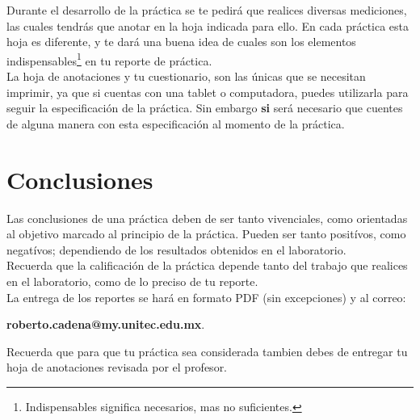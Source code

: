     Durante el desarrollo de la práctica se te pedirá que realices diversas mediciones, las cuales tendrás que anotar en la hoja indicada para ello. En cada práctica esta hoja es diferente, y te dará una buena idea de cuales son los elementos indispensables\footnote{Indispensables significa necesarios, mas no suficientes.} en tu reporte de práctica. \\

    La hoja de anotaciones y tu cuestionario, son las únicas que se necesitan imprimir, ya que si cuentas con una tablet o computadora, puedes utilizarla para seguir la especificación de la práctica. Sin embargo \textbf{si} será necesario que cuentes de alguna manera con esta especificación al momento de la práctica.


\section{Conclusiones}
	Las conclusiones de una práctica deben de ser tanto vivenciales, como orientadas al objetivo marcado al principio de la práctica. Pueden ser tanto positívos, como negatívos; dependiendo de los resultados obtenidos en el laboratorio. \\

	Recuerda que la calificación de la práctica depende tanto del trabajo que realices en el laboratorio, como de lo preciso de tu reporte. \\

	La entrega de los reportes se hará en formato PDF (sin excepciones) y al correo:

	\begin{center}
		\textbf{roberto.cadena@my.unitec.edu.mx}. \\
	\end{center}
	
	Recuerda que para que tu práctica sea considerada tambien debes de entregar tu hoja de anotaciones revisada por el profesor.

\begin{center}
	\huge \textthing
\end{center}
    

